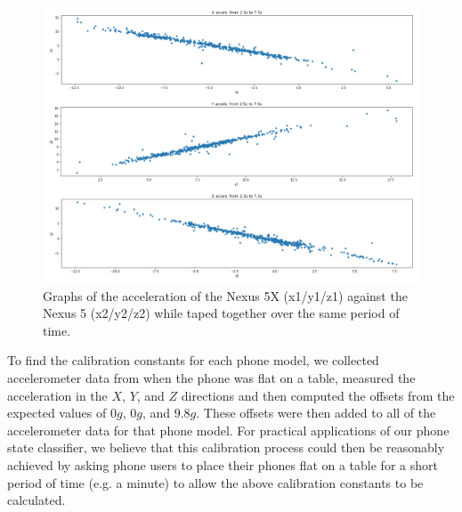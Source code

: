 \begin{figure}[!h]
\center
\includegraphics[scale=0.5]{two_phones}
\caption{Graphs of the acceleration of the Nexus 5X (x1/y1/z1) against the Nexus 5 (x2/y2/z2) while taped together over the same period of time.}
  \label{fig:tapedphones}
\end{figure}

To find the calibration constants for each phone model, we collected accelerometer
data from when the phone was flat on a table, measured the acceleration in the
$X$, $Y$, and $Z$ directions and then computed the offsets from the expected values of
$0g$, $0g$, and $9.8g$. These offsets were then added to all of the accelerometer data for that phone model.
For practical applications of our phone state classifier, we believe that this calibration process
could then be reasonably achieved by asking phone users to place their phones flat on a table for a short period of time (e.g. a minute)
to allow the above calibration constants to be calculated.


